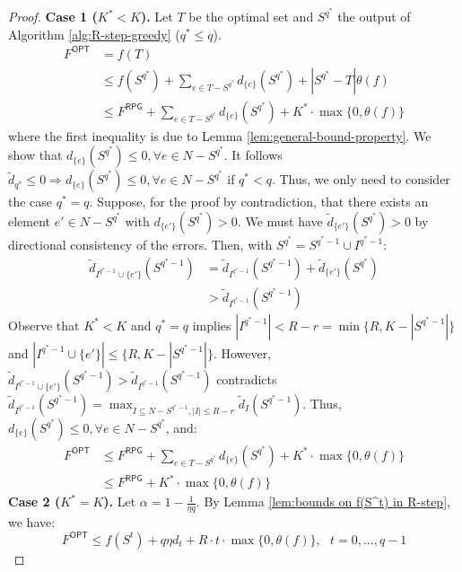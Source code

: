 \begin{proof}
\textbf{Case 1 ($K^* < K$).} Let $T$ be the optimal set and $S^{q^*}$ the output of Algorithm \ref{alg:R-step-greedy} ($q^* \leq q$).
\begin{equation*}
\begin{aligned}
    F^{\textsf{OPT}} &= f(T)   \\
    &\leq f(S^{q^*}) + \sum_{e \in T - S^{q^*}}{d_{\{e\}}(S^{q^*})}  + |S^{q^*} - T|\theta(f) \\ 
    &\leq F^{\textsf{RPG}} + \sum_{e \in T - S^{q^*}}{d_{\{e\}}(S^{q^*})} + K^* \cdot \max \{ 0, \theta(f) \}
\end{aligned}
\end{equation*}
where the first inequality is due to Lemma \ref{lem:general-bound-property}. We show that ${d}_{\{e\}}(S^{q^*}) \leq 0, \forall e \in N - S^{q^*}$. It follows $\tilde{d}_{q^*} \leq 0 \Rightarrow {d}_{\{e\}}(S^{q^*}) \leq 0, \forall e \in N - S^{q^*}$ if $q^* < q$. Thus, we only need to consider the case $q^* = q$.
Suppose, for the proof by contradiction, that there exists an element $e' \in N - S^{q^*}$ with ${d}_{\{e'\}}(S^{q^*}) > 0$. We must have $\tilde{d}_{\{e'\}}(S^{q^*}) > 0$ by directional consistency of the errors. Then, with $S^{q^*} = S^{q^*-1} \cup I^{q^*-1}$:
\begin{align*}
\tilde{d}_{I^{q^*-1} \cup \{ e' \}}(S^{q^*-1}) &= \tilde{d}_{I^{q^*-1}}(S^{q^*-1}) + \tilde{d}_{\{e'\}}(S^{q^*}) \\
&> \tilde{d}_{I^{q^*-1}}(S^{q^*-1})
\end{align*}
Observe that $K^* < K$ and $q^* = q$ implies $|I^{q^*-1}| < R - r = \min \{ R, K - |S^{q^*-1}| \}$ and $|I^{q^*-1} \cup \{ e' \}| \leq \{ R, K - |S^{q^*-1}| \}$. However, $\tilde{d}_{I^{q^*-1} \cup \{ e' \}}(S^{q^*-1}) > \tilde{d}_{I^{q^*-1}}(S^{q^*-1})$ contradicts $\tilde{d}_{I^{q^*-1}}(S^{q^*-1}) = \max_{I \subseteq N-S^{q^*-1}, |I| \leq R - r} {\tilde{d}_I(S^{q^*-1})}$. Thus, ${d}_{\{e\}}(S^{q^*}) \leq 0, \forall e \in N - S^{q^*}$, and: 
\begin{align*}
F^{\textsf{OPT}} &\leq F^{\textsf{RPG}} + \sum_{e \in T - S^{q^*}} d_{\{e\}}(S^{q^*}) + K^* \cdot \max \{0, \theta(f)\} \\
&\leq F^{\textsf{RPG}} + K^* \cdot \max \{0, \theta(f)\}
\end{align*}
\textbf{Case 2 ($K^* = K$).} Let $\alpha = 1 - \frac{1}{\eta q}$. By Lemma \ref{lem:bounds on f(S^t) in R-step}, we have:
\[ F^{\textsf{OPT}} \leq f(S^t) + q  \eta  d_{t} + R \cdot t \cdot \max \{ 0, \theta(f) \}, ~~~ t = 0, ..., q - 1 \]

\end{proof}
